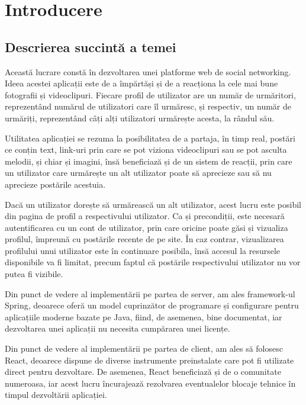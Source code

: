 \chapter{Introducere}
\section{Descrierea succintă a temei}

Această lucrare constă în dezvoltarea unei platforme web de social networking. Ideea acestei aplicații este de a împărtăși și de a reacționa la cele mai bune fotografii și videoclipuri. Fiecare profil de utilizator are un număr de urmăritori, reprezentând numărul de utilizatori care îl urmăresc, și respectiv, un număr de urmăriți, reprezentând câți alți utilizatori urmărește acesta, la rândul său.\newline

Utilitatea aplicației se rezuma la posibilitatea de a partaja, în timp real, postări ce conțin text, link-uri prin care se pot viziona videoclipuri sau se pot asculta melodii, și chiar și imagini, însă beneficiază și de un sistem de reacții, prin care un utilizator care urmărește un alt utilizator poate să aprecieze sau să nu aprecieze postările acestuia.\newline

Dacă un utilizator dorește să urmărească un alt utilizator, acest lucru este posibil din pagina de profil a respectivului utilizator. Ca și precondiții, este necesară autentificarea cu un cont de utilizator, prin care oricine poate găsi și vizualiza profilul, împreună cu postările recente de pe site. În caz contrar, vizualizarea profilului unui utilizator este în continuare posibila, însă accesul la resursele disponibile va fi limitat, precum faptul că postările respectivului utilizator nu vor putea fi vizibile.\newline

Din punct de vedere al implementării pe partea de server, am ales framework-ul Spring\cite{.springdoc}, deoarece oferă un model cuprinzător de programare și configurare pentru aplicațiile moderne bazate pe Java, fiind, de asemenea, bine documentat, iar dezvoltarea unei aplicații nu necesita cumpărarea unei licențe.\newline

Din punct de vedere al implementării pe partea de client, am ales să folosesc React\cite{.reactdoc}, deoarece dispune de diverse instrumente preinstalate care pot fi utilizate direct pentru dezvoltare. De asemenea, React beneficiază și de o comunitate numeroasa, iar acest lucru încurajează rezolvarea eventualelor blocaje tehnice în timpul dezvoltării aplicației.\newline

